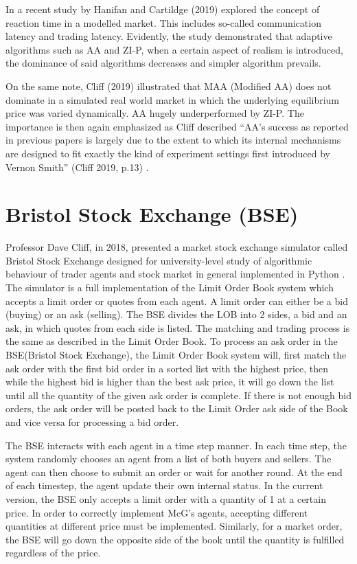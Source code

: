 In a recent study by Hanifan and Cartildge (2019) \cite{foolsrush} explored the concept of reaction time in a modelled market. This includes so-called communication latency and trading latency. Evidently, the study demonstrated that adaptive algorithms such as AA and ZI-P, when a certain aspect of realism is introduced, the dominance of said algorithms decreases and simpler algorithm prevails. 

On the same note, Cliff (2019) illustrated that MAA (Modified AA) does not dominate in a simulated real world market in which the underlying equilibrium price was varied dynamically. AA hugely underperformed by ZI-P. The importance is then again emphasized as Cliff described ``AA’s success as reported in previous papers is largely due to the extent to which its internal mechanisms are designed to fit exactly the kind of experiment settings first introduced by Vernon Smith” (Cliff 2019, p.13) \cite{dcliff2013}. 

\section{Bristol Stock Exchange (BSE)}
Professor Dave Cliff, in 2018, presented a market stock exchange simulator called Bristol Stock Exchange designed for university-level study of algorithmic behaviour of trader agents and stock market in general implemented in Python \cite{BSE_code}. The simulator is a full implementation of the Limit Order Book system which accepts a limit order or quotes from each agent. A limit order can either be a bid (buying) or an ask (selling). The BSE divides the LOB into 2 sides, a bid and an ask, in which quotes from each side is listed. The matching and trading process is the same as described in the Limit Order Book. To process an ask order in the BSE(Bristol Stock Exchange), the Limit Order Book system will, first match the ask order with the first bid order in a sorted list with the highest price, then while the highest bid is higher than the best ask price, it will go down the list until all the quantity of the given ask order is complete. If there is not enough bid orders, the ask order will be posted back to the Limit Order ask side of the Book and vice versa for processing a bid order.

The BSE interacts with each agent in a time step manner. In each time step, the system randomly chooses an agent from a list of both buyers and sellers. The agent can then choose to submit an order or wait for another round. At the end of each timestep, the agent update their own internal status. In the current version, the BSE only accepts a limit order with a quantity of 1 at a certain price. In order to correctly implement McG’s agents, accepting different quantities at different price must be implemented. Similarly, for a market order, the BSE will go down the opposite side of the book until the quantity is fulfilled regardless of the price.

